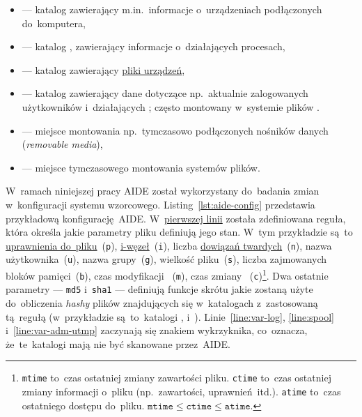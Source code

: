 \documentclass[thesis]{subfiles}
\begin{document}
\begin{itemize}
	\item {} --- katalog zawierający m.in.~informacje o~urządzeniach podłączonych do~komputera,
	\item {} --- katalog , zawierający informacje o~działających procesach,
	\item {} --- katalog zawierający \href{https://en.wikipedia.org/wiki/Device_file}{pliki urządzeń},
	\item {} --- katalog zawierający dane dotyczące np.~aktualnie zalogowanych użytkowników i~działających ; często montowany w~systemie plików .
	\item {} --- miejsce montowania np.~tymczasowo podłączonych nośników danych (\emph{removable media}),
	\item {} --- miejsce tymczasowego montowania systemów plików.
\end{itemize}

W~ramach niniejszej pracy AIDE został wykorzystany do~badania zmian w~konfiguracji systemu wzorcowego. Listing~\ref{lst:aide-config} przedstawia przykładową konfigurację~AIDE. W~\hyperref[line:custom-rule]{pierwszej linii} została zdefiniowana reguła, która określa jakie parametry pliku definiują jego stan. W~tym przykładzie są~to \href{https://www.linux.com/learn/understanding-linux-file-permissions}{uprawnienia do~pliku}~(\texttt{p}), \href{https://en.wikipedia.org/wiki/Inode}{i-węzeł}~(\texttt{i}), liczba \href{https://en.wikipedia.org/wiki/Hard_link}{dowiązań twardych}~(\texttt{n}), nazwa użytkownika~(\texttt{u}), nazwa grupy~(\texttt{g}), wielkość pliku~(\texttt{s}), liczba zajmowanych bloków pamięci~(\texttt{b}), czas modyfikacji ~(\texttt{m}), czas zmiany ~(\texttt{c})\footnote{\texttt{mtime} to~czas ostatniej zmiany zawartości pliku. \texttt{ctime} to~czas ostatniej zmiany informacji o~pliku (np.~zawartości, uprawnień~itd.). \texttt{atime} to~czas ostatniego dostępu do~pliku. $\texttt{mtime} \leq \texttt{ctime} \leq \texttt{atime}$.}. Dwa ostatnie parametry --- \texttt{md5} i~\texttt{sha1} --- definiują funkcje skrótu jakie zostaną użyte do~obliczenia \emph{hashy} plików znajdujących się w~katalogach z~zastosowaną tą~regułą (w~przykładzie są~to~katalogi ,  i~). Linie~\ref{line:var-log}, \ref{line:spool} i~\ref{line:var-adm-utmp} zaczynają się znakiem wykrzyknika, co~oznacza, że~te~katalogi mają nie być skanowane przez~AIDE.
\end{document}
